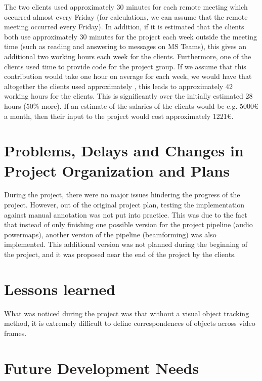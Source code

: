 The two clients used approximately 30 minutes for each remote meeting which occurred almost every Friday (for calculations, we can assume that the remote meeting occurred every Friday). In addition, if it is estimated that the clients both use approximately 30 minutes for the project each week outside the meeting time (such as reading and answering to messages on MS Teams), this gives an additional two working hours each week for the clients. Furthermore, one of the clients used time to provide code for the project group. If we assume that this contribution would take one hour on average for each week, we would have that altogether the clients used approximately , this leads to approximately 42 working hours for the clients. This is significantly over the initially estimated 28 hours (50\% more). If an estimate of the salaries of the clients would be e.g. 5000{\euro} a month, then their input to the project would cost approximately 1221{\euro}.

\section{Problems, Delays and Changes in Project Organization and Plans}

During the project, there were no major issues hindering the progress of the project. However, out of the original project plan, testing the implementation against manual annotation was not put into practice. This was due to the fact that instead of only finishing one possible version for the project pipeline (audio powermaps), another version of the pipeline (beamforming) was also implemented. This additional version was not planned during the beginning of the project, and it was proposed near the end of the project by the clients.

\section{Lessons learned}

What was noticed during the project was that without a visual object tracking method, it is extremely difficult to define correspondences of objects across video frames.


\section{Future Development Needs}

